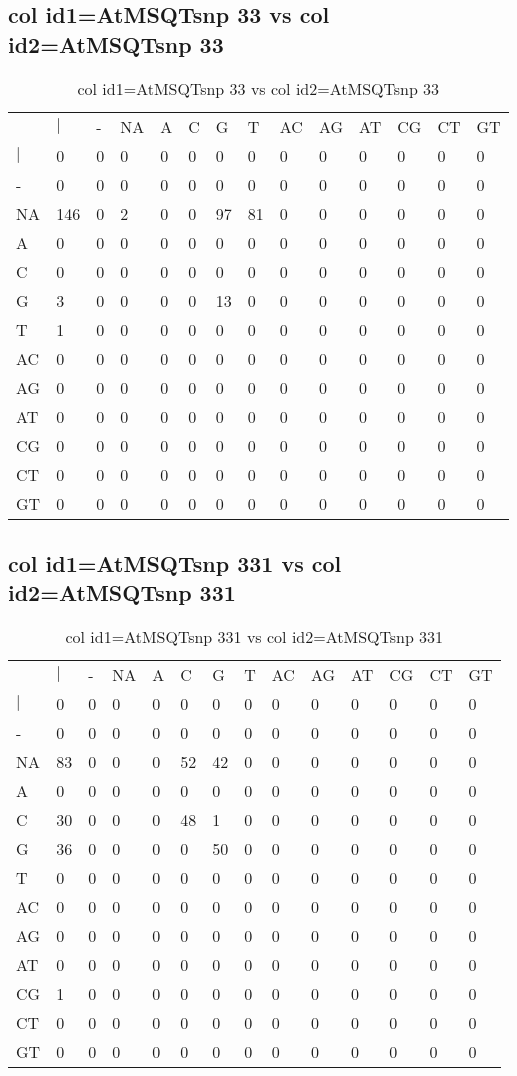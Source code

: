 \subsection{col id1=AtMSQTsnp 33 vs col id2=AtMSQTsnp 33}
\begin{center}
\begin{longtable}{|l|l|l|l|l|l|l|l|l|l|l|l|l|l|}
\caption{col id1=AtMSQTsnp 33 vs col id2=AtMSQTsnp 33} \label{table_dm864}\\
\hline
\\
\hline
&$|$&-&NA&A&C&G&T&AC&AG&AT&CG&CT&GT\\
$|$&0&0&0&0&0&0&0&0&0&0&0&0&0\\
-&0&0&0&0&0&0&0&0&0&0&0&0&0\\
NA&146&0&2&0&0&97&81&0&0&0&0&0&0\\
A&0&0&0&0&0&0&0&0&0&0&0&0&0\\
C&0&0&0&0&0&0&0&0&0&0&0&0&0\\
G&3&0&0&0&0&13&0&0&0&0&0&0&0\\
T&1&0&0&0&0&0&0&0&0&0&0&0&0\\
AC&0&0&0&0&0&0&0&0&0&0&0&0&0\\
AG&0&0&0&0&0&0&0&0&0&0&0&0&0\\
AT&0&0&0&0&0&0&0&0&0&0&0&0&0\\
CG&0&0&0&0&0&0&0&0&0&0&0&0&0\\
CT&0&0&0&0&0&0&0&0&0&0&0&0&0\\
GT&0&0&0&0&0&0&0&0&0&0&0&0&0\\
\hline
\end{longtable}
\end{center}

\subsection{col id1=AtMSQTsnp 331 vs col id2=AtMSQTsnp 331}
\begin{center}
\begin{longtable}{|l|l|l|l|l|l|l|l|l|l|l|l|l|l|}
\caption{col id1=AtMSQTsnp 331 vs col id2=AtMSQTsnp 331} \label{table_dm866}\\
\hline
\\
\hline
&$|$&-&NA&A&C&G&T&AC&AG&AT&CG&CT&GT\\
$|$&0&0&0&0&0&0&0&0&0&0&0&0&0\\
-&0&0&0&0&0&0&0&0&0&0&0&0&0\\
NA&83&0&0&0&52&42&0&0&0&0&0&0&0\\
A&0&0&0&0&0&0&0&0&0&0&0&0&0\\
C&30&0&0&0&48&1&0&0&0&0&0&0&0\\
G&36&0&0&0&0&50&0&0&0&0&0&0&0\\
T&0&0&0&0&0&0&0&0&0&0&0&0&0\\
AC&0&0&0&0&0&0&0&0&0&0&0&0&0\\
AG&0&0&0&0&0&0&0&0&0&0&0&0&0\\
AT&0&0&0&0&0&0&0&0&0&0&0&0&0\\
CG&1&0&0&0&0&0&0&0&0&0&0&0&0\\
CT&0&0&0&0&0&0&0&0&0&0&0&0&0\\
GT&0&0&0&0&0&0&0&0&0&0&0&0&0\\
\hline
\end{longtable}
\end{center}

